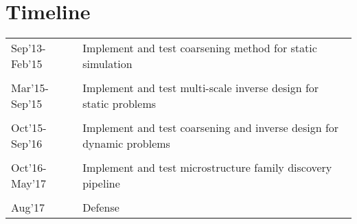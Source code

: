 \newpage
\section{Timeline}
\begin{tabular} {L{3cm}| l}
Sep'13-Feb'15  & Implement and test coarsening method for static simulation\\
\\
Mar'15-Sep'15 & Implement and test multi-scale inverse design for static problems\\
\\
Oct'15-Sep'16 & Implement and test coarsening and inverse design for dynamic problems\\
\\
Oct'16-May'17 & Implement and test microstructure family discovery pipeline\\
\\
Aug'17 & Defense
\end{tabular}